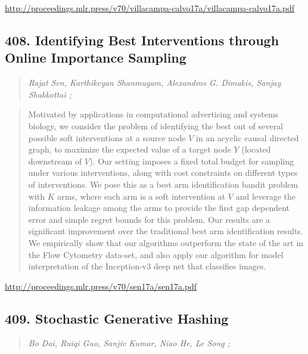\documentclass{article}
\begin{document}
\href{http://proceedings.mlr.press/v70/villacampa-calvo17a/villacampa-calvo17a.pdf}{http://proceedings.mlr.press/v70/villacampa-calvo17a/villacampa-calvo17a.pdf}

\subsection{408. Identifying Best Interventions through Online Importance Sampling}

\begin{quote}
\footnotesize{\textit{Rajat Sen, Karthikeyan Shanmugam, Alexandros G. Dimakis, Sanjay Shakkottai ;}}

\end{quote}

\begin{quote}
    Motivated by applications in computational advertising and systems biology, we consider the problem of identifying the best out of several possible soft interventions at a source node $V$ in an acyclic causal directed graph, to maximize the expected value of a target node $Y$ (located downstream of $V$). Our setting imposes a fixed total budget for sampling under various interventions, along with cost constraints on different types of interventions. We pose this as a best arm identification bandit problem with $K$ arms, where each arm is a soft intervention at $V$ and leverage the information leakage among the arms to provide the first gap dependent error and simple regret bounds for this problem. Our results are a significant improvement over the traditional best arm identification results. We empirically show that our algorithms outperform the state of the art in the Flow Cytometry data-set, and also apply our algorithm for model interpretation of the Inception-v3 deep net that classifies images.  
\end{quote}

\href{http://proceedings.mlr.press/v70/sen17a/sen17a.pdf}{http://proceedings.mlr.press/v70/sen17a/sen17a.pdf}

\subsection{409. Stochastic Generative Hashing}

\begin{quote}
\footnotesize{\textit{Bo Dai, Ruiqi Guo, Sanjiv Kumar, Niao He, Le Song ;}}

\end{quote}
\end{document}
